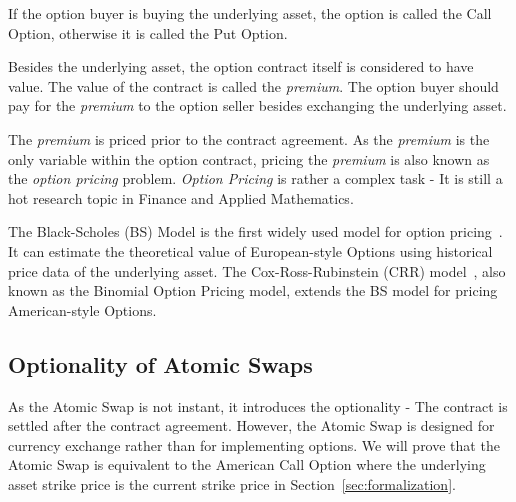 If the option buyer is buying the underlying asset, the option is called the Call Option, otherwise it is called the Put Option.

Besides the underlying asset, the option contract itself is considered to have value.
The value of the contract is called the \textit{premium}.
The option buyer should pay for the \textit{premium} to the option seller besides exchanging the underlying asset.

The \textit{premium} is priced prior to the contract agreement.
As the \textit{premium} is the only variable within the option contract,
pricing the \textit{premium} is also known as the \textit{option pricing} problem.
\textit{Option Pricing} is rather a complex task - It is still a hot research topic in Finance and Applied Mathematics.

The Black-Scholes (BS) Model is the first widely used model for option pricing~\cite{black1973pricing}.
It can estimate the theoretical value of European-style Options using historical price data of the underlying asset.
The Cox-Ross-Rubinstein (CRR) model~\cite{cox1979option}, also known as the Binomial Option Pricing model, extends the BS model for pricing American-style Options.

\subsection{Optionality of Atomic Swaps}

As the Atomic Swap is not instant, it introduces the optionality - The contract is settled after the contract agreement.
However, the Atomic Swap is designed for currency exchange rather than for implementing options.
We will prove that the Atomic Swap is equivalent to the American Call Option
where the underlying asset strike price is the current strike price in Section~\ref{sec:formalization}.